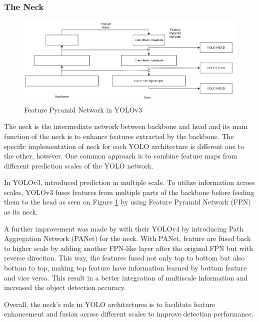     \subsubsection{The Neck}
  
    \begin{figure}
        \centering
        \includegraphics[scale=0.55]{figures/yolo-architecture-rough.png}
        \caption{Feature Pyramid Network in YOLOv3}
        \label{fig:yolofpn}
    \end{figure}

    The neck is the intermediate network between backbone and head and its
    main function of the neck is to enhance features extracted by the backbone.
    The specific implementation of neck for each YOLO architecture is different one to the other, however.
    One common approach is to combine feature maps from different prediction scales of the YOLO network.

    In YOLOv3, \textcite{yolov3} introduced prediction in multiple scale.
    To utilize information across scales, YOLOv3 fuses features 
    from multiple parts of the backbone before feeding them to the head as seen on Figure \ref{fig:yolofpn} 
    by using Feature Pyramid Network (FPN) as its neck. 

    A further improvement was made by \textcite{yolov4} with their YOLOv4 by introducing Path 
    Aggregation Network (PANet) for the neck. 
    With PANet, feature are fused back to higher scale by adding another FPN-like layer after the original FPN
    but with reverse direction.  This way, the features fused not only top to bottom but also bottom to top, making top feature have information learned by bottom feature and vice versa. 
    This result in a better integration of multiscale information and increased the object detection accuracy.

    Overall, the neck's role in YOLO architectures is to facilitate feature enhancement and fusion across different scales to improve detection performance.
  
